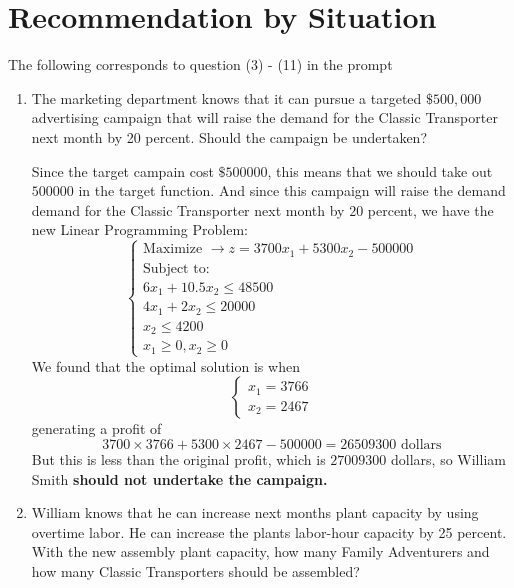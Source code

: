 \documentclass[
]{article}
\begin{document}
\hypertarget{recommendation-by-situation}{%
\section{Recommendation by
Situation}\label{recommendation-by-situation}}

The following corresponds to question (3) - (11) in the prompt

\begin{enumerate}
\def\labelenumi{\arabic{enumi}.}
\item
  The marketing department knows that it can pursue a targeted
  \(\$ 500,000\) advertising campaign that will raise the demand for the
  Classic Transporter next month by 20 percent. Should the campaign be
  undertaken?

  Since the target campain cost \(\$ 500000\), this means that we should
  take out \(500000\)\hspace{0pt} in the target function. And since this
  campaign will raise the demand demand for the Classic Transporter next
  month by \(20\) percent, we have the new Linear Programming Problem:
  \[
  \begin{cases}
           \text{Maximize  } \rightarrow z = 3700x_1 + 5300x_2 -500000\\
           \text{Subject to:}\\
           6x_1 +10.5x_2 \leq 48500\\
           4x_1 + 2x_2 \leq 20000\\
           x_2 \leq 4200\\
           x_1 \geq 0, x_2 \geq 0
   \end{cases}
  \] We found that the optimal solution is when \[
  \begin{cases}
           x_1 = 3766\\ 
           x_2 = 2467
   \end{cases}
  \] generating a profit of \[
  3700 \times 3766 + 5300 \times 2467 - 500000 = 26509300 \text{   dollars}
  \] But this is less than the original profit, which is \(27009300\)
  dollars, so William Smith \textbf{should not undertake the campaign.}
\item
  William knows that he can increase next months plant capacity by using
  overtime labor. He can increase the plants labor-hour capacity by 25
  percent. With the new assembly plant capacity, how many Family
  Adventurers and how many Classic Transporters should be assembled?


\end{enumerate}
\end{document}

